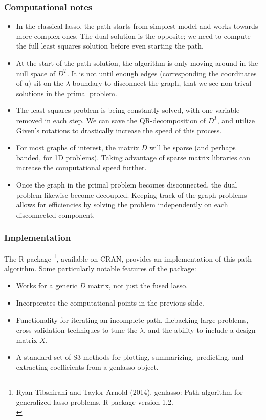 \begin{frame}
  \frametitle{Computational notes}
  \footnotesize

  \begin{itemize}
  \item In the classical lasso, the path starts from simplest model and works towards
  more complex ones. The dual solution is the opposite; we need to compute the full
  least squares solution before even starting the path.\pause
  \item At the start of the path solution, the algorithm is only moving around in the
  null space of $D^T$. It is not until enough edges (corresponding the coordinates of
  u) sit on the $\lambda$ boundary to disconnect the graph, that we see non-trival
  solutions in the primal problem.\pause
  \item The least squares problem is being constantly solved, with one variable removed
  in each step. We can save the QR-decomposition of $D^T$, and utilize Given's rotations
  to drastically increase the speed of this process.\pause
  \item For most graphs of interest, the matrix $D$ will be sparse (and perhaps banded,
  for 1D problems). Taking advantage of sparse matrix libraries can increase the
  computational speed further.\pause
  \item Once the graph in the primal problem becomes disconnected, the dual problem
  likewise become decoupled. Keeping track of the graph problems allows for efficiencies
  by solving the problem independently on each disconnected component.
  \end{itemize}

\end{frame}

\begin{frame}
  \frametitle{Implementation}
  \footnotesize

  The R package \footnote{Ryan Tibshirani and
  Taylor Arnold (2014). genlasso: Path algorithm for generalized lasso problems.
  R package version 1.2.\\}, available on CRAN, provides an implementation of this
  path algorithm. Some particularly notable features of the package:
  \begin{itemize}
  \item Works for a generic $D$ matrix, not just the fused lasso.
  \item Incorporates the computational points in the previous slide.
  \item Functionality for iterating an incomplete path, filebacking large problems,
  cross-validation techniques to tune the $\lambda$, and the ability to include a
  design matrix $X$.
  \item A standard set of S3 methods for plotting, summarizing, predicting, and
  extracting coefficients from a genlasso object.
  \end{itemize}

\end{frame}

